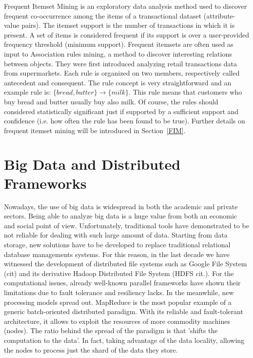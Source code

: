 Frequent Itemset Mining is an exploratory data analysis method used to discover frequent co-occurrence among the items of a transactional dataset (attribute-value pairs). The itemset support is the number of transactions in which it is present. A set of items is considered frequent if its support is over a user-provided frequency threshold (minimum support).
Frequent itemsets are often used as input to Association rules mining, a method to discover interesting relations between objects. They were first introduced analyzing retail transactions data from supermarkets. Each rule is organized on two members, respectively called antecedent and consequent. The rule concept is very straightforward and an example rule is: $\{bread, butter\} \rightarrow \{milk\}$. This rule means that customers who buy bread and butter usually buy also milk. Of course, the rules should considered statistically significant just if supported by a sufficient support and confidence (i.e. how often the rule has been found to be true).
Further details on frequent itemset mining will be introduced in Section~\ref{FIM}.



\section{Big Data and Distributed Frameworks}
Nowadays, the use of big data is widespread in both the academic and private sectors. Being able to analyze big data is a huge value from both an economic and social point of view. Unfortunately, traditional tools have demonstrated to be not reliable for dealing with such large amount of data.
Starting from data storage, new solutions have to be developed to replace traditional relational database managements systems. For this reason, in the last decade we have witnessed the development of distributed file systems such as Google File System (cit) and its derivative Hadoop Distributed File System (HDFS cit.). For the computational issues, already well-known parallel frameworks have shown their limitations due to fault tolerance and resiliency lacks. In the meanwhile, new processing models spread out. 
MapReduce is the most popular example of a generic batch-oriented distributed paradigm. With its reliable and fault-tolerant architecture, it allows to exploit the resources of more commodity machines (nodes). The ratio behind the spread of the paradigm is that 'shifts the computation to the data'.
In fact, taking advantage of the data locality, allowing the nodes to process just the shard of the data they store.

